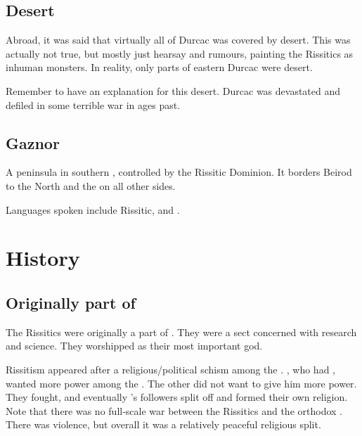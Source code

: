 \subsection{Desert}
Abroad, it was said that virtually all of Durcac was covered by desert. 
This was actually not true, but mostly just hearsay and rumours, painting the Rissitics as inhuman monsters. 
In reality, only parts of eastern Durcac were desert. 

Remember to have an explanation for this desert. 
Durcac was devastated and defiled in some terrible war in ages past. 





\subsection{Gaznor}
A peninsula in southern \Velcad{}, controlled by the Rissitic Dominion. It borders Beirod to the North and the \Risvaelsea{} on all other sides. 

Languages spoken include Rissitic, \Velcadian{} and \Ortic. 















\section{History}





\subsection{Originally part of \Ortaica}
The Rissitics were originally a part of \Ortaica. 
They were a \rethyactic{} sect concerned with research and science. 
They worshipped \Secherdamon as their most important god. 

Rissitism appeared after a religious/political schism among the \Taorthae. 
\Secherdamon, who had , wanted more power among the \taorthae.
The other \taorthae did not want to give him more power. 
They fought, and eventually \Secherdamon's followers split off and formed their own religion. 
Note that there was no full-scale war between the Rissitics and the orthodox \Ortaicans. 
There was violence, but overall it was a relatively peaceful religious split. 

